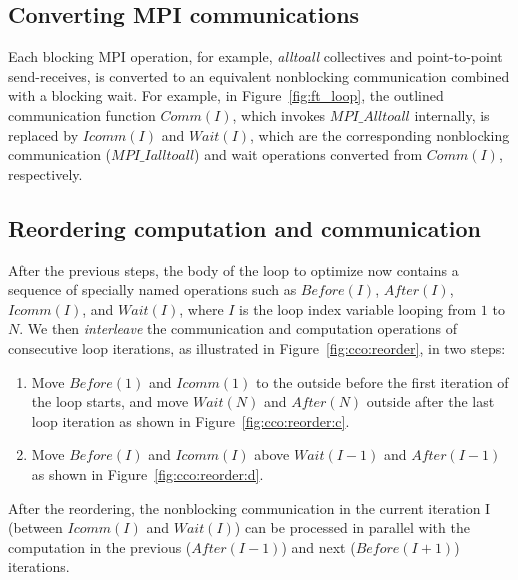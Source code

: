 \subsection{Converting MPI communications}
Each blocking MPI operation, for example, {\em alltoall} collectives and point-to-point send-receives,
is converted to an equivalent nonblocking communication combined with a blocking wait.
For example,  in Figure~\ref{fig:ft_loop}, the outlined communication function $Comm(I)$,  which invokes $MPI\_Alltoall$ internally, is replaced by $Icomm(I)$ and $Wait(I)$, which are the corresponding nonblocking communication ($MPI\_Ialltoall$) and wait operations converted from $Comm(I)$, respectively.

\subsection{Reordering computation and communication}

After the previous steps, the body of the loop to optimize now contains a sequence of specially
named operations such as
 $Before(I)$, $After(I)$, $Icomm(I)$, and $Wait(I)$,
  where $I$ is the loop index variable looping from $1$ to $N$.
%
%
%
%
%
We then %
  \emph{interleave} the communication and computation operations of consecutive loop iterations,
  as illustrated in Figure~\ref{fig:cco:reorder},  in two steps:
\begin{enumerate}
\item Move $Before(1)$ and $Icomm(1)$ to the outside before the first iteration of the loop starts,
  and move $Wait(N)$ and $After(N)$ outside after the last loop iteration
  as shown in Figure~\ref{fig:cco:reorder:c}.
\item Move $Before(I)$ and $Icomm(I)$ above $Wait(I-1)$ and $After(I-1)$
  as shown in Figure~\ref{fig:cco:reorder:d}.
\end{enumerate}
After the reordering, the nonblocking communication in the current iteration I (between $Icomm(I)$ and $Wait(I)$)
   can be processed in parallel with the computation in the previous ($After(I-1)$) and next ($Before(I+1)$) iterations.


